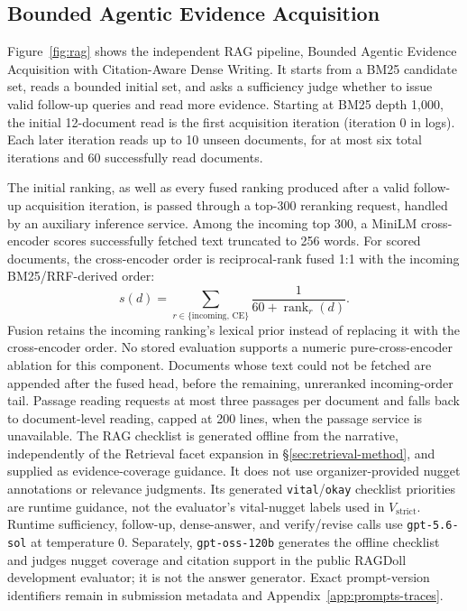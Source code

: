 \subsection{Bounded Agentic Evidence Acquisition}
\label{sec:rag-method}

Figure~\ref{fig:rag} shows the independent RAG pipeline, Bounded
Agentic Evidence Acquisition with Citation-Aware Dense Writing. It
starts from a BM25 candidate set, reads a bounded initial set, and asks
a sufficiency judge whether to issue valid follow-up queries and read
more evidence. Starting at BM25 depth 1,000, the initial 12-document read
is the first acquisition iteration (iteration 0 in logs). Each later
iteration reads up to 10 unseen documents, for at most six total iterations
and 60 successfully read documents.

The initial ranking, as well as every fused ranking produced after a
valid follow-up acquisition iteration, is passed through a top-300 reranking request,
handled by an auxiliary inference service. Among the incoming top 300,
a MiniLM cross-encoder scores successfully fetched text truncated to
256 words. For scored documents, the cross-encoder order is reciprocal-rank
fused 1:1 with the incoming BM25/RRF-derived order:
\begin{equation}
s(d) = \sum_{r \in \{\mathrm{incoming},\,\mathrm{CE}\}} \frac{1}{60 + \operatorname{rank}_r(d)}.
\label{eq:rag-rerank}
\end{equation}
Fusion retains the incoming ranking's lexical prior instead of
replacing it with the cross-encoder order. No stored evaluation supports
a numeric pure-cross-encoder ablation for this component. Documents
whose text could not be fetched are appended after the fused head,
before the remaining, unreranked incoming-order tail. Passage reading
requests at most three passages per document and falls back to
document-level reading, capped at 200 lines, when the passage service is
unavailable. The RAG checklist is generated offline from the narrative,
independently of the Retrieval facet expansion in
\S\ref{sec:retrieval-method}, and supplied as evidence-coverage guidance.
It does not use organizer-provided nugget annotations or relevance judgments.
Its generated \texttt{vital}/\texttt{okay} checklist priorities are runtime
guidance, not the evaluator's vital-nugget labels used in $V_{\mathrm{strict}}$.
Runtime sufficiency,
follow-up, dense-answer, and verify/revise calls use
\texttt{gpt-5.6-sol} at temperature 0. Separately,
\texttt{gpt-oss-120b} generates the offline checklist and judges nugget
coverage and citation support in the public RAGDoll development evaluator; it
is not the answer generator. Exact prompt-version identifiers remain in
submission metadata and Appendix~\ref{app:prompts-traces}.

